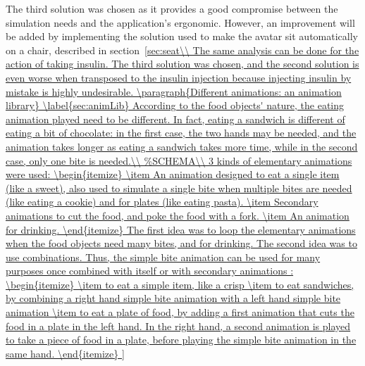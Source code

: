 The third solution was chosen as it provides a good compromise between the simulation needs and the application's ergonomic. However, an improvement will be added by implementing the solution used to make the avatar sit automatically on a chair, described in section~\ref{sec:seat\\

The same analysis can be done for the action of taking insulin. The third solution was chosen, and the second solution is even worse when transposed to the insulin injection because injecting insulin by mistake is highly undesirable.

	\paragraph{Different animations: an animation library}
\label{sec:animLib}

According to the food objects' nature, the eating animation played need to be different. In fact, eating a sandwich is different of eating a bit of chocolate: in the first case, the two hands may be needed, and the animation takes longer as eating a sandwich takes more time, while in the second case, only one bite is needed.\\

3 kinds of elementary animations were used: 
\begin{itemize}
\item An animation designed to eat a single item (like a sweet), also used to simulate a single bite when multiple bites are needed (like eating a cookie) and for plates (like eating pasta).
\item Secondary animations to cut the food, and poke the food with a fork.
\item An animation for drinking.
\end{itemize}
The first idea was to loop the elementary animations when the food objects need many bites, and for drinking. The second idea was to use combinations. 

Thus, the simple bite animation can be used for many purposes once combined with itself or with secondary animations :
\begin{itemize}
\item to eat a simple item, like a crisp
\item to eat sandwiches, by combining a right hand simple bite animation with a left hand simple bite animation
\item to eat a plate of food, by adding a first animation that cuts the food in a plate in the left hand. In the right hand, a second animation is played to take a piece of food in a plate, before playing the simple bite animation in the same hand.
\end{itemize}

}
